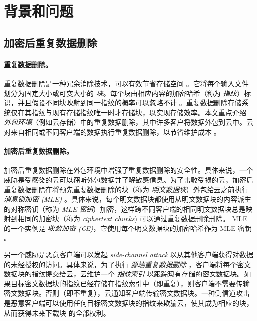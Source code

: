\section{背景和问题}
\label{sec:featurespy-background}

\subsection{加密后重复数据删除}
\label{subsec:featurespy-basics}

\paragraph*{重复数据删除。}
重复数据删除是一种冗余消除技术，可以有效节省存储空间 \cite{wallace12, meyer2011deduplication}。它将每个输入文件划分为固定大小或可变大小的 {\em 块}。每个块由相应内容的加密哈希（称为 {\em 指纹}）标识，并且假设不同块映射到同一指纹的概率可以忽略不计 \cite{black2006compare}。重复数据删除存储系统仅在其指纹与现有存储指纹唯一时才存储块，以实现存储效率。本文重点介绍 {\em 外包环境}（例如云存储）中的重复数据删除，其中许多客户将数据外包到云中。云对来自相同或不同客户端的数据执行重复数据删除，以节省维护成本 \cite{harnik2010side}。


\paragraph*{加密后重复数据删除。}
加密后重复数据删除在外包环境中增强了重复数据删除的安全性。具体来说，一个威胁是受感染的云可以窃听外包数据并了解敏感信息。为了击败受损的云，加密后重复数据删除在将预先重复数据删除的块（称为 {\em 明文数据块}）外包给云之前执行 {\em 消息锁加密 (MLE)} \cite{bellare2013MLE, bellare2013DupLESS}。具体来说，每个明文数据块都使用从明文数据块的内容派生的对称密钥（称为 {\em MLE 密钥}）加密，这样跨不同客户端的相同明文数据块总是映射到相同的加密块（称为 {\em ciphertext chunks}) 可以通过重复数据删除删除。 MLE 的一个实例是 {\em 收敛加密 (CE)}，它使用每个明文数据块的加密哈希作为 MLE 密钥 \cite{douceur2002reclaiming}。

另一个威胁是恶意客户端可以发起 {\em side-channel attack} \cite{harnik2010side, halevi11} 以从其他客户端获得对数据的未经授权的访问。具体来说，为了执行 {\em 源端重复数据删除} \cite{harnik2010side}，客户端将每个密文数据块的指纹提交给云，云维护一个 {\em 指纹索引} 以跟踪现有存储的密文数据块。如果目标密文数据块的指纹已经存储在指纹索引中（即重复），则客户端不需要传输密文数据块。否则（即不重复），云通知客户端传输密文数据块。一种侧信道攻击 \cite{mulazzani11, halevi11} 是恶意客户端可以使用任何目标密文数据块的指纹来欺骗云，使其成为相应的块，从而获得未来下载块 \cite{mulazzani11} 的全部权利。


